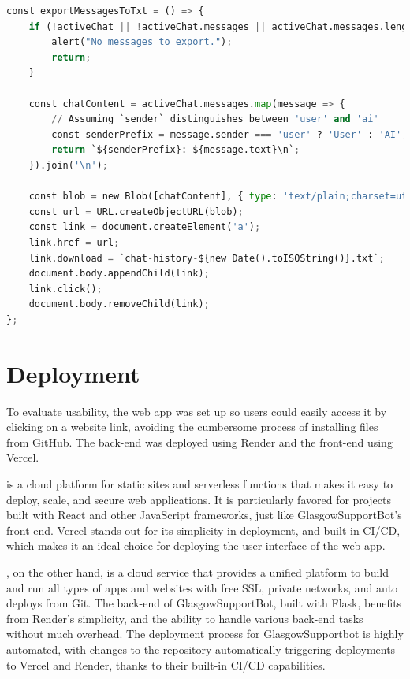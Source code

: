 \documentclass{l4proj}
\begin{document}
\begin{lstlisting}[language=Python, caption={Export Chat Messages to Text File.}, label={Export Chat Messages to Text File.}]
const exportMessagesToTxt = () => {
    if (!activeChat || !activeChat.messages || activeChat.messages.length === 0) {
        alert("No messages to export.");
        return;
    }

    const chatContent = activeChat.messages.map(message => {
        // Assuming `sender` distinguishes between 'user' and 'ai'
        const senderPrefix = message.sender === 'user' ? 'User' : 'AI';
        return `${senderPrefix}: ${message.text}\n`;
    }).join('\n');
    
    const blob = new Blob([chatContent], { type: 'text/plain;charset=utf-8' });
    const url = URL.createObjectURL(blob);
    const link = document.createElement('a');
    link.href = url;
    link.download = `chat-history-${new Date().toISOString()}.txt`;
    document.body.appendChild(link);
    link.click();
    document.body.removeChild(link);
};
\end{lstlisting}

\section{Deployment}


To evaluate usability, the web app was set up so users could easily access it by clicking on a website link, avoiding the cumbersome process of installing files from GitHub. The back-end was deployed using Render and the front-end using Vercel.

\textbf{\cite{vercel}} is a cloud platform for static sites and serverless functions that makes it easy to deploy, scale, and secure web applications. It is particularly favored for projects built with React and other JavaScript frameworks, just like GlasgowSupportBot's front-end. Vercel stands out for its simplicity in deployment, and built-in CI/CD, which makes it an ideal choice for deploying the user interface of the web app. 

\textbf{\cite{render}}, on the other hand, is a cloud service that provides a unified platform to build and run all types of apps and websites with free SSL, private networks, and auto deploys from Git. The back-end of GlasgowSupportBot, built with Flask, benefits from Render's simplicity, and the ability to handle various back-end tasks without much overhead. The deployment process for GlasgowSupportbot is highly automated, with changes to the repository automatically triggering deployments to Vercel and Render, thanks to their built-in CI/CD capabilities.
\end{document}
